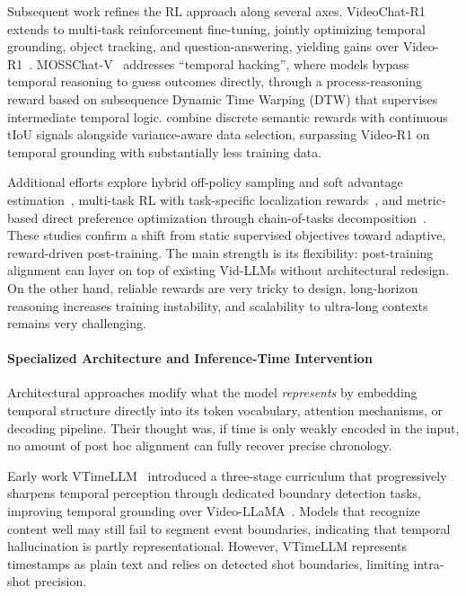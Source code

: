 \documentclass[10pt]{article} %
\begin{document}
Subsequent work refines the RL approach along several axes. VideoChat-R1~\citep{Li2025VideoChatR1ES} extends to multi-task reinforcement fine-tuning, jointly optimizing temporal grounding, object tracking, and question-answering, yielding gains over Video-R1~\citep{Feng2025VideoR1RV}. MOSSChat-V~\citep{Tao2025MOSSChatVRL} addresses ``temporal hacking'', where models bypass temporal reasoning to guess outcomes directly, through a process-reasoning reward based on subsequence Dynamic Time Warping (DTW) that supervises intermediate temporal logic. \citet{Li2025ReinforcementLT} combine discrete semantic rewards with continuous tIoU signals alongside variance-aware data selection, surpassing Video-R1 on temporal grounding with substantially less training data.

Additional efforts explore hybrid off-policy sampling and soft advantage estimation~\citep{Li2025TempSampR1ET}, multi-task RL with task-specific localization rewards~\citep{Wu2025TempR1IT}, and metric-based direct preference optimization through chain-of-tasks decomposition~\citep{Lee2025VidChainCW}. These studies confirm a shift from static supervised objectives toward adaptive, reward-driven post-training. The main strength is its flexibility: post-training alignment can layer on top of existing Vid-LLMs without architectural redesign. On the other hand, reliable rewards are very tricky to design, long-horizon reasoning increases training instability, and scalability to ultra-long contexts remains very challenging.

\paragraph{Specialized Architecture and Inference-Time Intervention}

Architectural approaches modify what the model \emph{represents} by embedding temporal structure directly into its token vocabulary, attention mechanisms, or decoding pipeline. Their thought was, if time is only weakly encoded in the input, no amount of post hoc alignment can fully recover precise chronology.

Early work VTimeLLM~\citep{Huang2023VTimeLLMEL} introduced a three-stage curriculum that progressively sharpens temporal perception through dedicated boundary detection tasks, improving temporal grounding over Video-LLaMA~\citep{Zhang2023VideoLLaMAAI}. Models that recognize content well may still fail to segment event boundaries, indicating that temporal hallucination is partly representational. However, VTimeLLM represents timestamps as plain text and relies on detected shot boundaries, limiting intra-shot precision.
\end{document}

